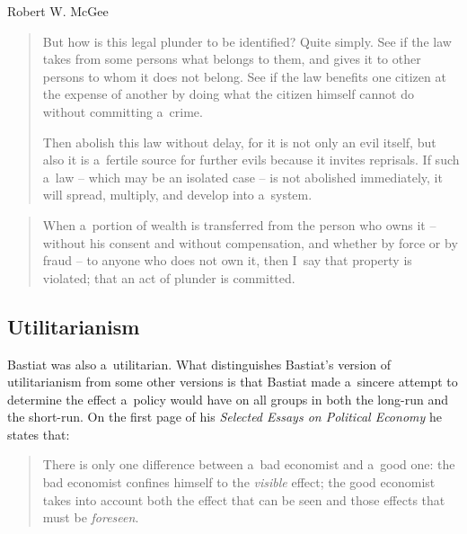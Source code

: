 \begin{artengenv}{Robert W. McGee}
\begin{quote}
But how is this legal plunder to be identified? Quite simply. See if the law takes from some persons what belongs to them, and gives it to other persons to whom it does not belong. See if the law benefits one citizen at the expense of another by doing what the citizen himself cannot do without committing a~crime.



Then abolish this law without delay, for it is not only an evil itself, but also it is a~fertile source for further evils because it invites reprisals. If such a~law -- which may be an isolated case -- is not abolished immediately, it will spread, multiply, and develop into a~system. 
\parencite[][p.17]{bastiat_law_1998}%
\end{quote}


\begin{quote}
When a~portion of wealth is transferred from the person who owns it -- without his consent and without compensation, and whether by force or by fraud -- to anyone who does not own it, then I~say that property is violated; that an act of plunder is committed. 
\parencite[][p.22]{bastiat_law_1998}%
\end{quote}




\subsection{Utilitarianism}



Bastiat was also a~utilitarian. What distinguishes Bastiat's version of utilitarianism from some other versions is that Bastiat made a~sincere attempt to determine the effect a~policy would have on all groups in both the long-run and the short-run. On the first page of his \textit{Selected Essays on Political Economy} 
\parencites[][p.1]{bastiat_selected_1964}[][I, p.1]{bastiat_bastiat_2007} %
 he states that:



\begin{quote}
There is only one difference between a~bad economist and a~good one: the bad economist confines himself to the \textit{visible} effect; the good economist takes into account both the effect that can be seen and those effects that must be \textit{foreseen}. 
\parencite[][p.1]{bastiat_selected_1964}%
\end{quote}





\end{artengenv}
